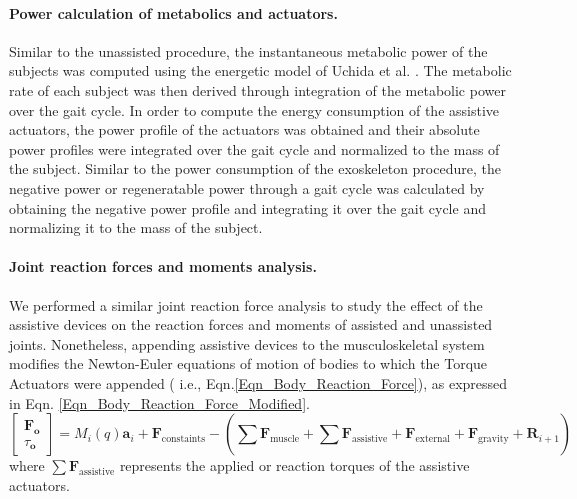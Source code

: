 \documentclass[10pt,letterpaper]{article}
\begin{document}
\paragraph*{Power calculation of metabolics and actuators.} Similar to the unassisted procedure, the instantaneous metabolic power of the subjects was computed using the energetic model of Uchida et al. \cite{106}. The metabolic rate of each subject was then derived through integration of the metabolic power over the gait cycle. In order to compute the energy consumption of the assistive actuators, the power profile of the actuators was obtained and their absolute power profiles were integrated over the gait cycle and normalized to the mass of the subject. Similar to the power consumption of the exoskeleton procedure, the negative power or regeneratable power through a gait cycle was calculated by obtaining the negative power profile and integrating it over the gait cycle and normalizing it to the mass of the subject.\\
\paragraph{Joint reaction forces and moments analysis.} We performed a similar joint reaction force analysis to study the effect of the assistive devices on the reaction forces and moments of assisted and unassisted joints. Nonetheless, appending assistive devices to the musculoskeletal system modifies the Newton-Euler equations of motion of bodies to which the Torque Actuators were appended ( i.e., Eqn.\eqref{Eqn_Body_Reaction_Force}), as expressed in Eqn. \eqref{Eqn_Body_Reaction_Force_Modified}.
\begin{equation}\label{Eqn_Body_Reaction_Force_Modified}
\left\lbrack \begin{array}{c}
{\mathit{\mathbf{F}}}_{\mathit{\mathbf{o}}} \\
\tau_{\mathit{\mathbf{o}}} 
\end{array}\right\rbrack =M_i \left(q\right){\mathit{\mathbf{a}}}_i +{\mathit{\mathbf{F}}}_{\mathrm{c}\mathrm{o}\mathrm{n}\mathrm{s}\mathrm{t}\mathrm{a}\mathrm{i}\mathrm{n}\mathrm{t}\mathrm{s}} -\left(\sum_{\;}^{\;} {\mathit{\mathbf{F}}}_{\mathrm{m}\mathrm{u}\mathrm{s}\mathrm{c}\mathrm{l}\mathrm{e}} +\sum{\mathit{\mathbf{F}}}_{\mathrm{assistive}} +{\mathit{\mathbf{F}}}_{\mathrm{e}\mathrm{x}\mathrm{t}\mathrm{e}\mathrm{r}\mathrm{n}\mathrm{a}\mathrm{l}} +{\mathit{\mathbf{F}}}_{\mathrm{g}\mathrm{r}\mathrm{a}\mathrm{v}\mathrm{i}\mathrm{t}\mathrm{y}} +{\mathit{\mathbf{R}}}_{i+1} \right)
\end{equation}
where $\sum{\mathit{\mathbf{F}}}_{\mathrm{assistive}}$ represents the applied or reaction torques of the assistive actuators.
\end{document}
